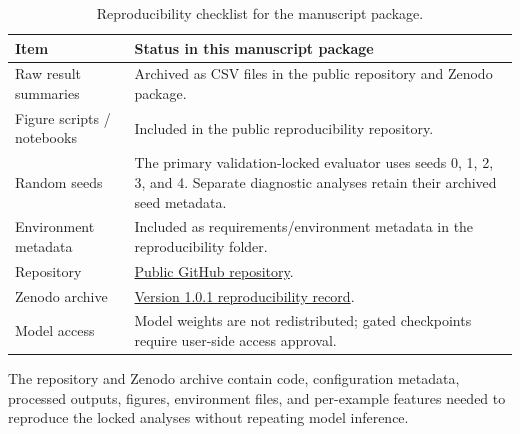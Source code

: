 \begin{table}[t]
\centering
\small
\caption{Reproducibility checklist for the manuscript package.}
\label{tab:reproducibility}
\begin{threeparttable}

\begin{tabular}{p{}p{}}
\toprule
Item & Status in this manuscript package \\
\midrule
Raw result summaries & Archived as CSV files in the public repository and Zenodo package. \\
Figure scripts / notebooks & Included in the public reproducibility repository. \\
Random seeds & The primary validation-locked evaluator uses seeds 0, 1, 2, 3, and 4. Separate diagnostic analyses retain their archived seed metadata. \\
Environment metadata & Included as requirements/environment metadata in the reproducibility folder. \\
Repository & \href{https://github.com/NazimRiyadh/slm-mcq-selective-prediction}{Public GitHub repository}. \\
Zenodo archive & \href{https://doi.org/10.5281/zenodo.20732806}{Version 1.0.1 reproducibility record}. \\
Model access & Model weights are not redistributed; gated checkpoints require user-side access approval. \\
\bottomrule
\end{tabular}

\begin{tablenotes}[flushleft]\footnotesize\item \parbox{0.95\textwidth}{The repository and Zenodo archive contain code, configuration metadata, processed outputs, figures, environment files, and per-example features needed to reproduce the locked analyses without repeating model inference.}\end{tablenotes}
\end{threeparttable}
\end{table}
